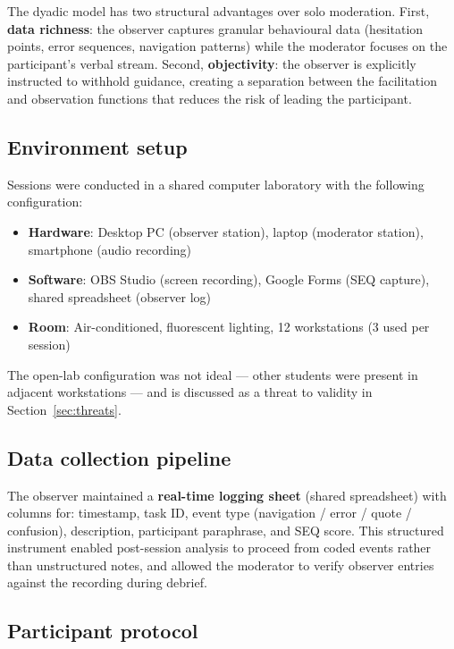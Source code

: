\documentclass[conference]{IEEEtran}
\begin{document}
The dyadic model has two structural advantages over solo moderation. First, \textbf{data richness}:
the observer captures granular behavioural data (hesitation points, error sequences, navigation
patterns) while the moderator focuses on the participant's verbal stream. Second,
\textbf{objectivity}: the observer is explicitly instructed to withhold guidance, creating a
separation between the facilitation and observation functions that reduces the risk of leading the
participant.

\subsection{Environment setup}

Sessions were conducted in a shared computer laboratory with the following configuration:

\begin{itemize}
  \item \textbf{Hardware}: Desktop PC (observer station), laptop (moderator station), smartphone
    (audio recording)
  \item \textbf{Software}: OBS Studio (screen recording), Google Forms (SEQ capture), shared
    spreadsheet (observer log)
  \item \textbf{Room}: Air-conditioned, fluorescent lighting, 12 workstations (3 used per session)
\end{itemize}

The open-lab configuration was not ideal --- other students were present in adjacent workstations ---
and is discussed as a threat to validity in Section~\ref{sec:threats}.

\subsection{Data collection pipeline}

The observer maintained a \textbf{real-time logging sheet} (shared spreadsheet) with columns for:
timestamp, task ID, event type (navigation / error / quote / confusion), description, participant
paraphrase, and SEQ score. This structured instrument enabled post-session analysis to proceed from
coded events rather than unstructured notes, and allowed the moderator to verify observer entries
against the recording during debrief.

\subsection{Participant protocol}
\end{document}

